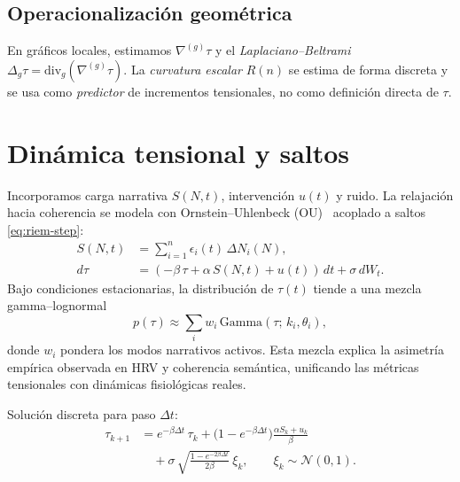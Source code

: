 \documentclass[10pt,a4paper,twocolumn]{article}
\theoremstyle{definition}
\theoremstyle{plain}
\begin{document}
\subsection{Operacionalización geométrica}
En gráficos locales, estimamos \(\nabla^{(g)}\tau\) y el \emph{Laplaciano--Beltrami} \(\Delta_g\tau=\mathrm{div}_g(\nabla^{(g)}\tau)\). La \emph{curvatura escalar} \(R(n)\) se estima de forma discreta y se usa como \emph{predictor} de incrementos tensionales, no como definición directa de \(\tau\).

\section{Dinámica tensional y saltos}
\label{sec:modelo}
Incorporamos carga narrativa \(S(N,t)\), intervención \(u(t)\) y ruido. La relajación hacia coherencia se modela con Ornstein--Uhlenbeck (OU)~\cite{uhlenbeck1930,nelson1967} acoplado a saltos \eqref{eq:riem-step}:
\begin{align}
S(N,t) &= \sum_{i=1}^{n}\epsilon_i(t)\,\Delta N_i(N), \label{eq:S}\\
d\tau &= \left(-\beta\,\tau+\alpha\,S(N,t)+u(t)\right)\,dt+\sigma\, dW_t. \label{eq:ou}
\end{align}
Bajo condiciones estacionarias, la distribución de $\tau(t)$ tiende a una mezcla gamma–lognormal
\[
p(\tau) \approx \sum_i w_i \, \mathrm{Gamma}(\tau;\,k_i,\theta_i),
\]
donde $w_i$ pondera los modos narrativos activos. Esta mezcla explica la asimetría empírica observada en HRV y coherencia semántica, unificando las métricas tensionales con dinámicas fisiológicas reales.

Solución discreta para paso \(\Delta t\):
\begin{equation}
\begin{aligned}
\tau_{k+1} &= e^{-\beta\Delta t}\,\tau_k 
+ \bigl(1-e^{-\beta\Delta t}\bigr)\frac{\alpha S_k + u_k}{\beta} \\
&\quad + \sigma\,\sqrt{\frac{1-e^{-2\beta\Delta t}}{2\beta}}\,\xi_k,
\qquad \xi_k\sim\mathcal{N}(0,1).
\end{aligned}
\label{eq:ou_discreto}
\end{equation}
\end{document}
